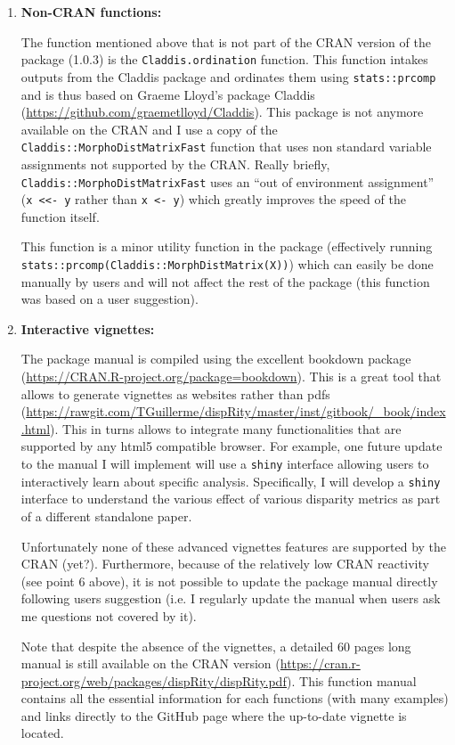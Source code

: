 \documentclass[12pt,letterpaper]{article}
\begin{document}
\begin{enumerate}

\item{\textbf{Non-CRAN functions:}}

The function mentioned above that is not part of the CRAN version of the package (1.0.3) is the \texttt{Claddis.ordination} function.
This function intakes outputs from the Claddis package and ordinates them using \texttt{stats::prcomp} and is thus based on Graeme Lloyd's package Claddis (\url{https://github.com/graemetlloyd/Claddis}).
This package is not anymore available on the CRAN and I use a copy of the \texttt{Claddis::MorphoDistMatrixFast} function that uses non standard variable assignments not supported by the CRAN.
Really briefly, \texttt{Claddis::MorphoDistMatrixFast} uses an ``out of environment assignment'' (\texttt{x <<- y} rather than \texttt{x <- y}) which greatly improves the speed of the function itself.

This function is a minor utility function in the package (effectively running \texttt{stats::prcomp(Claddis::MorphDistMatrix(X))}) which can easily be done manually by users and will not affect the rest of the package (this function was based on a user suggestion).

\item{\textbf{Interactive vignettes:}}

The package manual is compiled using the excellent bookdown package (\url{https://CRAN.R-project.org/package=bookdown}).
This is a great tool that allows to generate vignettes as websites rather than pdfs (\url{https://rawgit.com/TGuillerme/dispRity/master/inst/gitbook/_book/index.html}).
This in turns allows to integrate many functionalities that are supported by any html5 compatible browser.
For example, one future update to the manual I will implement will use a \texttt{shiny} interface allowing users to interactively learn about specific analysis.
Specifically, I will develop a \texttt{shiny} interface to understand the various effect of various disparity metrics as part of a different standalone paper.

Unfortunately none of these advanced vignettes features are supported by the CRAN (yet?).
Furthermore, because of the relatively low CRAN reactivity (see point 6 above), it is not possible to update the package manual directly following users suggestion (i.e. I regularly update the manual when users ask me questions not covered by it).

Note that despite the absence of the vignettes, a detailed 60 pages long manual is still available on the CRAN version (\url{https://cran.r-project.org/web/packages/dispRity/dispRity.pdf}).
This function manual contains all the essential information for each functions (with many examples) and links directly to the GitHub page where the up-to-date vignette is located. 


\end{enumerate}
\end{document}
